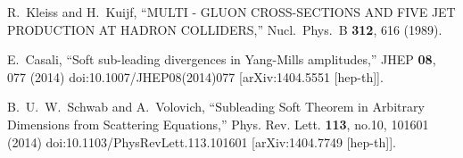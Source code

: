 \documentclass[preprint,showpacs,onecolumn,nofootinbib]{revtex4}
\begin{document}
\begin{thebibliography}{}


  R.~Kleiss and H.~Kuijf,
  ``MULTI - GLUON CROSS-SECTIONS AND FIVE JET PRODUCTION AT HADRON COLLIDERS,''
  Nucl.\ Phys.\  B {\bf 312}, 616 (1989).



E.~Casali,
``Soft sub-leading divergences in Yang-Mills amplitudes,''
JHEP \textbf{08}, 077 (2014)
doi:10.1007/JHEP08(2014)077
[arXiv:1404.5551 [hep-th]].

B.~U.~W.~Schwab and A.~Volovich,
``Subleading Soft Theorem in Arbitrary Dimensions from Scattering Equations,''
Phys. Rev. Lett. \textbf{113}, no.10, 101601 (2014)
doi:10.1103/PhysRevLett.113.101601
[arXiv:1404.7749 [hep-th]].



\end{thebibliography}
\end{document}
